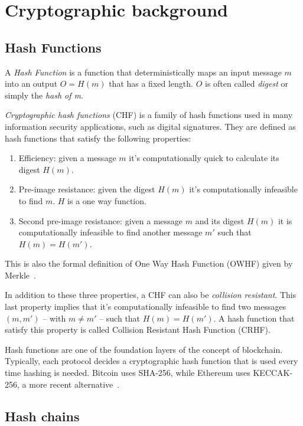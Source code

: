 \label{chapter-2}

\section{Cryptographic background}

\subsection{Hash Functions}

A \textit{Hash Function} is a function that deterministically maps an input message $m$ into an output $O=H(m)$ that has a fixed length. $O$ is often called \textit{digest} or simply the \textit{hash of m}.\

\textit{Cryptographic hash functions} (CHF) is a family of hash functions used in many information security applications, such as digital signatures. They are defined as hash functions that satisfy the following properties:

\begin{enumerate}
    \item Efficiency: given a message $m$ it's computationally quick to calculate its digest $H(m)$.
    \item Pre-image resistance: given the digest $H(m)$ it's computationally infeasible to find $m$. $H$ is a one way function.
    \item Second pre-image resistance: given a message $m$ and its digest $H(m)$ it is computationally infeasible to find another message $m'$ such that $H(m)=H(m')$.
\end{enumerate}

This is also the formal definition of One Way Hash Function (OWHF) given by Merkle~\cite{chf}. \

In addition to these three properties, a CHF can also be \textit{collision resistant}. This last property implies that it's computationally infeasible to find two messages $(m,m')$ -- with $m\neq m'$ -- such that $H(m)=H(m')$. A hash function that satisfy this property is called Collision Resistant Hash Function (CRHF).

Hash functions are one of the foundation layers of the concept of blockchain. Typically, each protocol decides a cryptographic hash function that is used every time hashing is needed. Bitcoin uses SHA-256, while Ethereum uses KECCAK-256, a more recent alternative~\cite{bitcoin,Ethereum}.

\subsection{Hash chains}

